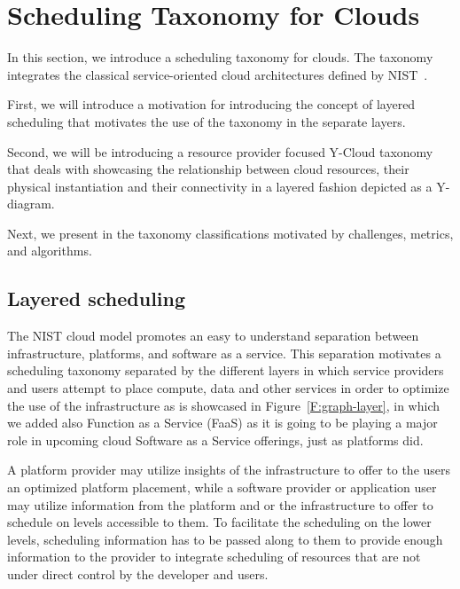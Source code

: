 \documentclass[final,5p,times,twocolumn]{elsarticle}
\begin{document}
\section{Scheduling Taxonomy for Clouds}\label{sec:taxonomy}

In this section, we introduce a scheduling taxonomy for clouds. The taxonomy integrates the classical service-oriented cloud architectures defined by NIST~\cite{mell2011nist}. 

First, we will introduce a motivation for introducing the concept of layered scheduling that motivates the use of the taxonomy in the separate layers.

Second, we will be introducing a resource provider focused Y-Cloud taxonomy that deals with showcasing the relationship between cloud resources, their physical instantiation and their connectivity in a layered fashion depicted as a Y-diagram.

Next, we present in the taxonomy classifications motivated by challenges, metrics, and algorithms.


\subsection{Layered scheduling}

The NIST cloud model promotes an easy to understand separation between infrastructure, platforms, and software as a service. This separation motivates a scheduling taxonomy separated by the different layers in which service providers and users attempt to place compute, data and other services in order to optimize the use of the infrastructure as is showcased in Figure~\ref{F:graph-layer}, in which we added also Function as a Service (FaaS) as it is going to be playing a major role in upcoming cloud Software as a Service offerings, just as platforms did.






A platform provider may utilize insights of the infrastructure to offer to the users an optimized platform placement, while a software provider or application user may utilize information from the platform and or the infrastructure to offer to schedule on levels accessible to them. To facilitate the scheduling on the lower levels, scheduling information has to be passed along to them to provide enough information to the provider to integrate scheduling of resources that are not under direct control by the developer and users.
\end{document}
